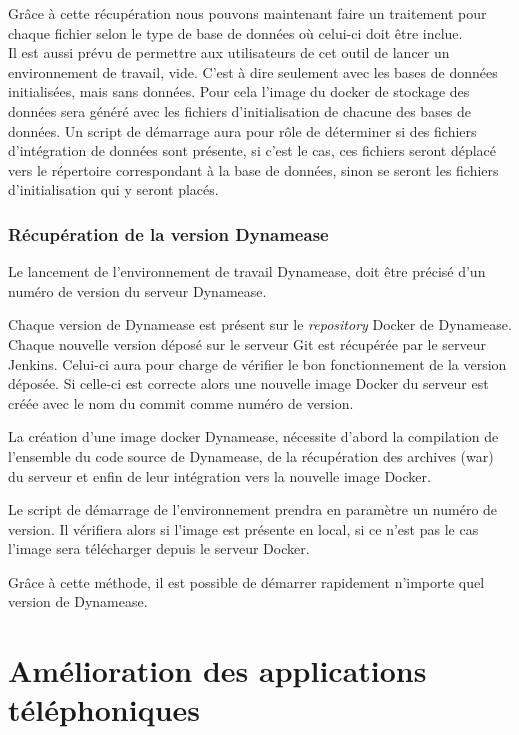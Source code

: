 Grâce à cette récupération nous pouvons maintenant faire un traitement pour chaque fichier selon le type de base de données où celui-ci doit être inclue.\\

Il est aussi prévu de permettre aux utilisateurs de cet outil de lancer un environnement de travail, vide. C'est à dire seulement avec les bases de données initialisées, mais sans données. Pour cela l'image du docker de stockage des données sera généré avec les fichiers d'initialisation de chacune des bases de données. Un script de démarrage aura pour rôle de déterminer si des fichiers d'intégration de données sont présente, si c'est le cas, ces fichiers seront déplacé vers le répertoire correspondant à la base de données, sinon se seront les fichiers d'initialisation qui y seront placés. 

\subsubsection{Récupération de la version Dynamease}

Le lancement de l'environnement de travail Dynamease, doit être précisé d'un numéro de version du serveur Dynamease. 

Chaque version de Dynamease est présent sur le \textit{repository} Docker de Dynamease. Chaque nouvelle version déposé sur le serveur Git est récupérée par le serveur Jenkins. Celui-ci aura pour charge de vérifier le bon fonctionnement de la version déposée. Si celle-ci est correcte alors une nouvelle image Docker du serveur est créée avec le nom du commit comme numéro de version.

La création d'une image docker Dynamease, nécessite d'abord la compilation de l'ensemble du code source de Dynamease, de la récupération des archives (war) du serveur et enfin de leur intégration vers la nouvelle image Docker.

Le script de démarrage de l'environnement prendra en paramètre un numéro de version. Il vérifiera alors si l'image est présente en local, si ce n'est pas le cas l'image sera télécharger depuis le serveur Docker.

Grâce à cette méthode, il est possible de démarrer rapidement n'importe quel version de Dynamease.

\section{Amélioration des applications téléphoniques}

